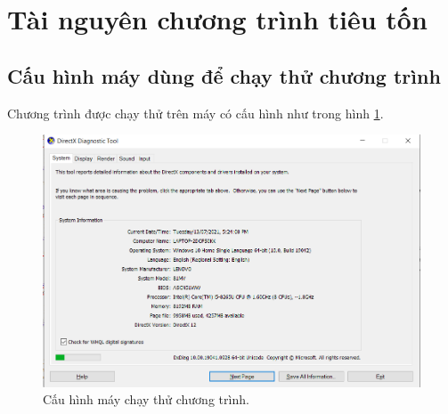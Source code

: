 \documentclass[12pt,a4paper]{article}
\begin{document}
\section{Tài nguyên chương trình tiêu tốn}
\subsection{Cấu hình máy dùng để chạy thử chương trình}
Chương trình được chạy thử trên máy có cấu hình như trong hình \ref{Fig28}.
\begin{figure}[H]
\begin{center}
\includegraphics[scale=0.62]{Fig28}
\end{center}
\caption{Cấu hình máy chạy thử chương trình.}
\label{Fig28}
\end{figure}
\end{document}
